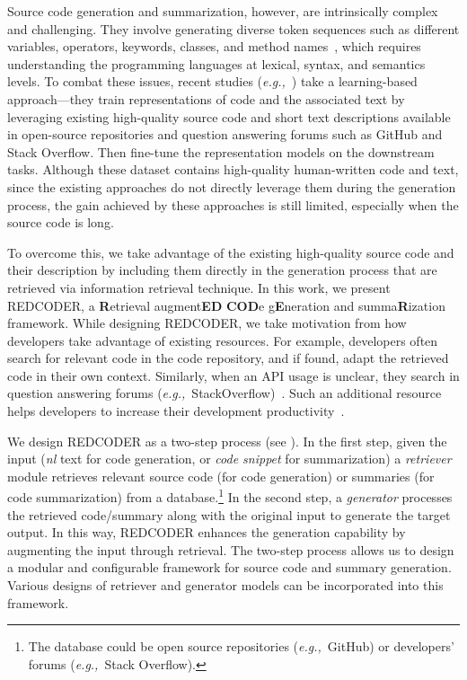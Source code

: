 \documentclass[11pt]{article}
\newcommand{\tool}{{REDCODER}\xspace}
\newcommand{\toolnospace}{REDCODER}
\newcommand{\eg}{\textit{e.g.,}~}
\begin{document}
Source code generation and summarization, however, are intrinsically complex and challenging.
They involve generating diverse token sequences such as different variables, operators, keywords, classes, and method names~\cite{parvez-etal-2018-building}, which requires understanding the programming languages at lexical, syntax, and semantics levels. To combat these issues, recent studies (\eg \citet{ahmad2021unified, guo2020graphcodebert, xu-etal-2020-incorporating, feng2020codebert, xu-etal-2020-incorporating}) take a learning-based approach---they train representations of code and the associated text by leveraging existing high-quality source code and short text descriptions available in open-source repositories and question answering forums such as GitHub and Stack Overflow. Then fine-tune the representation models on the downstream tasks. 
Although these dataset contains high-quality human-written code and text, since the existing approaches do not directly leverage them during the generation process, the gain achieved by these approaches is still limited, especially when the source code is long.



To overcome this, we take advantage of the existing high-quality source code and their description by including them directly in the generation process that are retrieved via information retrieval technique.
In this work, we present \toolnospace, \textrm{a {\bf R}etrieval augment{\bf ED} {\bf COD}e g{\bf E}neration and summa{\bf R}ization} framework. While designing \tool, we take motivation from how developers take advantage of existing resources. For example, developers often search for relevant code in the code repository, and if found, adapt the retrieved code in their own context. 
Similarly, when an API usage is unclear, they search in question answering forums (\eg StackOverflow)~\cite{brandt2010example, sadowski2015developers}. Such an additional resource helps developers to increase their development productivity~\cite{li2013help}.

We design \tool as a two-step process (see ). In the first step, given the input ({\em nl} text for code generation, or {\em code snippet} for summarization) a \emph{retriever} module retrieves relevant source code 
(for code generation) 
or summaries (for code summarization) from a database.\footnote{The database could be open source repositories (\eg GitHub) or developers' forums (\eg Stack Overflow).} In the second step, a \emph{generator} processes the retrieved code/summary along with the original input to generate the target output. In this way, \tool enhances the generation capability by augmenting the input through retrieval. 
The two-step process allows us to design a modular and configurable framework for source code and summary generation. Various designs of retriever and generator models can be incorporated into this framework.
\end{document}
